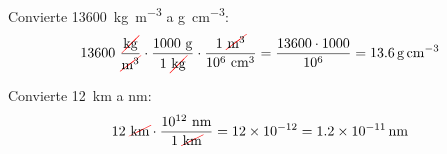 \begin{example}
    Convierte \qty{13600}{\kilo\g\per\cubic\metre} a \unit{\g\per\cubic\centi\metre}:
    \begin{equation*}
        13600\ \dfrac{\cancelred{\unit{\kilo\g}}}{\cancel{\unit{\cubic\metre}}} \cdot \dfrac{1000\ \unit{\g}}{1\ \cancelred{\unit{\kilo\g}}} \cdot \dfrac{1\ \cancelred{\unit{\cubic\metre}}}{\num{e6}\ \unit{\cubic\centi\metre}} = \dfrac{13600 \cdot 1000}{\num{e6}} = \qty{13.6}{\g\per\cubic\centi\metre}
    \end{equation*}
\end{example}

\begin{example}
    Convierte \qty{12}{\kilo\metre} a \unit{\nano\metre}:
    \begin{equation*}
        12\ \cancelred{\unit{\kilo\metre}} \cdot  \dfrac{\num{e12}\ \unit{\nano\metre}}{ 1\ \cancelred{\unit{\kilo\metre}}} = \num{12e-12} = \qty{1.2e-11}{\nano\metre}
    \end{equation*}
\end{example}

